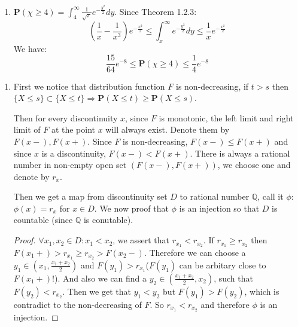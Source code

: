 \documentclass[11pt]{article}
\newcommand{\prob}[1]{\textbf{P} \left( #1 \right)}
\begin{document}
\begin{enumerate}[1.2.2]
    \item
    $\prob{\chi \ge 4} = \int_4^\infty \frac{1}{\sqrt{\pi}} e^{-\frac{y^2}{2}} d y$. Since Theorem 1.2.3:
    $$(\frac{1}{x} - \frac{1}{x^3})e^{-\frac{x^2}{2}} \le \int_x^\infty e^{-\frac{y^2}{2}} d y \le \frac{1}{x}e^{-\frac{x^2}{2}}$$
    We have:
    $$\frac{15}{64}e^{-8} \le \prob{\chi \ge 4} \le \frac{1}{4} e^{-8}$$
\end{enumerate}

\begin{enumerate}[1.2.3]
    \item
    First we notice that distribution function $F$ is non-decreasing, if $t > s$ then $\{X \le s\} \subset \{X \le t\} \Rightarrow \prob{X\le t} \ge \prob{X \le s}$.
    
    Then for every discontinuity $x$, since $F$ is monotonic, the left limit and right limit of $F$ at the point $x$ will always exist.
    Denote them by $F(x-), F(x+)$. Since $F$ is non-decreasing, $F(x-) \le F(x+)$ and since $x$ is a discontinuity, $F(x-) < F(x+)$. There is always a rational number in non-empty open set $(F(x-), F(x+))$, we choose one and denote by $r_x$.
    
    Then we get a map from discontinuity set $D$ to rational number $\mathbb{Q}$, call it $\phi$: $\phi(x) = r_x$ for $x \in D$.
    We now proof that $\phi$ is an injection so that $D$ is countable (since $\mathbb{Q}$ is conutable).
    \begin{proof}
        $\forall x_1,x_2 \in D: x_1 < x_2$, we assert that $r_{x_1} < r_{x_2}$. If $r_{x_1} \ge r_{x_2}$ then $F(x_1 +) > r_{x_1} \ge r_{x_2} > F(x_2 -)$. Therefore we can choose a $y_1 \in (x_1,\frac{x_1+x_2}{2})$ and $F(y_1) > r_{x_1}$($F(y_1)$ can be arbitary close to $F(x_1+)$!).
        And also we can find a $y_2 \in (\frac{x_1+x_2}{2}, x_2)$, such that $F(y_2) < r_{x_2}$. Then we get that $y_1 < y_2$ but $F(y_1) > F(y_2)$, which is contradict to the non-decreasing of $F$. So $r_{x_1} < r_{x_2}$ and therefore $\phi$ is an injection.
    \end{proof}
\end{enumerate}
\end{document}
